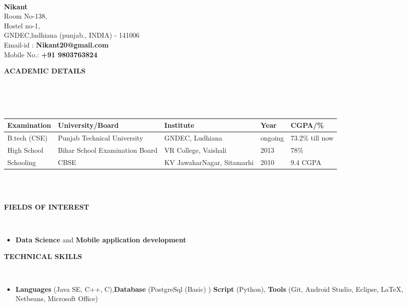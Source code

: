 \documentclass[a4paper,10pt]{article}
\newcommand{\lsep}{-0.5cm}
\newcommand{\resheading}[1]{{\small \colorbox{mygrey}{\begin{minipage}{0.975\textwidth}{\textbf{#1 \vphantom{p\^{E}}}}\end{minipage}}}}
\begin{document}
\hspace{0.5cm}\\[-0.2cm]

\textbf{Nikant} \\
\indent Room No-138, \\
\indent Hostel no-1,  \\
\indent GNDEC,ludhiana (punjab., INDIA) - 141006\\
\indent Email-id : \textbf{Nikant20@gmail.com} \\
\indent Mobile No.: \textbf{+91 9803763824} \\

\resheading{\textbf{ACADEMIC DETAILS} }\\[\lsep]
\\ \\
\indent \begin{tabular}{ l @{\hskip 0.15in} l @{\hskip 0.15in} l @{\hskip 0.15in} l @{\hskip 0.15in} l }
\hline
\textbf{Examination} & \textbf{University/Board} & \textbf{Institute} & \textbf{Year} & \textbf{CGPA/\%} \\
\hline
B.tech (CSE)\,\, & Punjab Technical University & GNDEC, Ludhiana & ongoing & 73.2\% till now \\
High School & Bihar School Examination Board & VR College, Vaishali& 2013 & 78\% \\
Schooling & CBSE & KV JawaharNagar, Sitamarhi & 2010 & 9.4 CGPA\\
\hline
\end{tabular}
\\ \\

\resheading{\textbf{FIELDS OF INTEREST} }\\[\lsep]
\begin{itemize}
\item \noindent \textbf{Data Science} and \textbf{Mobile application development}
\end{itemize}

\resheading{\textbf{TECHNICAL SKILLS} }\\[\lsep]
\begin{itemize}
\item \noindent \textbf{Languages} (Java SE, C++, C),\textbf{Database} (PostgreSql (Basic) ) \textbf{Script} (Python), \textbf{Tools} (Git, Android Studio, Eclipse, \LaTeX, Netbeans, Microsoft Office)
\end{itemize}
\end{document}
